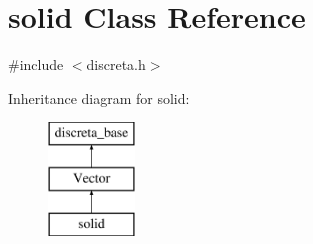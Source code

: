 \hypertarget{classsolid}{}\section{solid Class Reference}
\label{classsolid}


{\ttfamily \#include $<$discreta.\+h$>$}

Inheritance diagram for solid\+:\begin{figure}[H]
\begin{center}
\leavevmode
\includegraphics[height=3.000000cm]{classsolid}
\end{center}
\end{figure}
